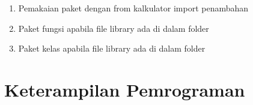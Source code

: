 \begin{enumerate}
\item Pemakaian paket dengan from kalkulator import penambahan\\


\item Paket fungsi apabila file library ada di dalam folder\\


\item  Paket kelas apabila file library ada di dalam folder\\


\end{enumerate}

\section{Keterampilan Pemrograman}

